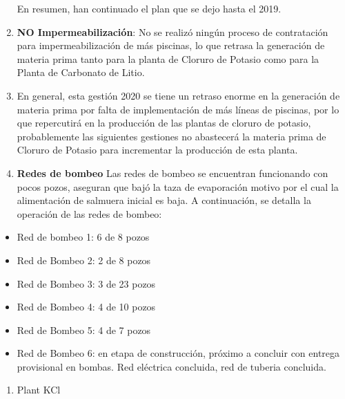 \documentclass[a4paper, nobind]{templates/ociamthesis}
\providecommand{\tightlist}{%
  \setlength{\itemsep}{0pt}\setlength{\parskip}{0pt}}
\begin{document}
\begin{enumerate}
  En resumen, han continuado el plan que se dejo hasta el 2019.
\item
  \textbf{NO Impermeabilización}: No se realizó ningún proceso de contratación para impermeabilización de más piscinas, lo que retrasa la generación de materia prima tanto para la planta de Cloruro de Potasio como para la Planta de Carbonato de Litio.
\item
  En general, esta gestión 2020 se tiene un retraso enorme en la generación de materia prima por falta de implementación de más líneas de piscinas, por lo que repercutirá en la producción de las plantas de cloruro de potasio, probablemente las siguientes gestiones no abastecerá la materia prima de Cloruro de Potasio para incrementar la producción de esta planta.
\item
  \textbf{Redes de bombeo}
  Las redes de bombeo se encuentran funcionando con pocos pozos, aseguran que bajó la taza de evaporación motivo por el cual la alimentación de salmuera inicial es baja.
  A continuación, se detalla la operación de las redes de bombeo:
\end{enumerate}

\begin{itemize}
\tightlist
\item
  Red de bombeo 1: 6 de 8 pozos
\item
  Red de Bombeo 2: 2 de 8 pozos
\item
  Red de Bombeo 3: 3 de 23 pozos
\item
  Red de Bombeo 4: 4 de 10 pozos
\item
  Red de Bombeo 5: 4 de 7 pozos
\item
  Red de Bombeo 6: en etapa de construcción, próximo a concluir con entrega provisional en bombas. Red eléctrica concluida, red de tuberia concluida.
\end{itemize}

\begin{enumerate}
\def\labelenumi{\arabic{enumi}.}
\setcounter{enumi}{6}
\tightlist
\item
  Plant KCl
\end{enumerate}
\end{document}
